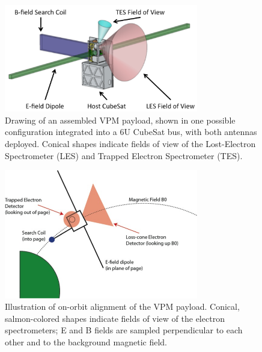 \begin{figure}[t]
\begin{center}
\includegraphics[width=20pc]{figures/vpm_figures/payload_figure_annotated.png}

\caption[Drawing of the assembled VPM payload on a 6U cubesat bus]{Drawing of an assembled VPM payload, shown in one possible configuration integrated into a 6U CubeSat bus, with both antennas deployed. Conical shapes indicate fields of view of the Lost-Electron Spectrometer (LES) and Trapped Electron Spectrometer (TES). }
\label{fig:VPM_full}
\end{center}
\end{figure}

\begin{figure}[t]
\begin{center}
\includegraphics[width=20pc]{figures/vpm_figures/operations.png}

\caption[On-orbit alignment of the VPM payload]{Illustration of on-orbit alignment of the VPM payload. Conical, salmon-colored shapes indicate fields of view of the electron spectrometers; E and B fields are sampled perpendicular to each other and to the background magnetic field.}
\label{fig:operations}
\end{center}
\end{figure}




